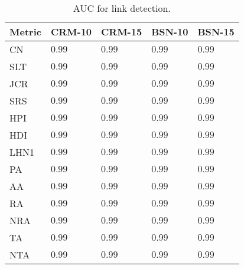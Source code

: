 
\begin{table}[h]
	\centering
	\begin{tabular}{l l l l l}
	\toprule
	\textbf{Metric} & \textbf{CRM-10} & \textbf{CRM-15} & \textbf{BSN-10} & \textbf{BSN-15}\\
	\midrule
		CN   & $0.99$ & $0.99$ & $0.99$ & $0.99$ \\
		SLT  & $0.99$ & $0.99$ & $0.99$ & $0.99$ \\
		JCR  & $0.99$ & $0.99$ & $0.99$ & $0.99$ \\
		SRS  & $0.99$ & $0.99$ & $0.99$ & $0.99$ \\
		HPI  & $0.99$ & $0.99$ & $0.99$ & $0.99$ \\
		HDI  & $0.99$ & $0.99$ & $0.99$ & $0.99$ \\
		LHN1 & $0.99$ & $0.99$ & $0.99$ & $0.99$ \\
		PA   & $0.99$ & $0.99$ & $0.99$ & $0.99$ \\
		AA   & $0.99$ & $0.99$ & $0.99$ & $0.99$ \\
		RA   & $0.99$ & $0.99$ & $0.99$ & $0.99$ \\
		NRA  & $0.99$ & $0.99$ & $0.99$ & $0.99$ \\
		TA   & $0.99$ & $0.99$ & $0.99$ & $0.99$ \\
		NTA  & $0.99$ & $0.99$ & $0.99$ & $0.99$ \\
	\bottomrule
	\end{tabular}
	\label{tab:auc-detection}
	\caption{AUC for link detection.}
\end{table}

